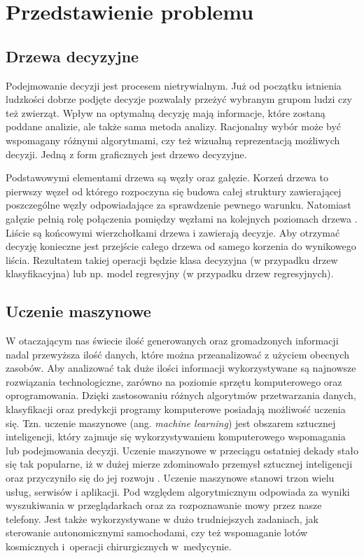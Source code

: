 \chapter{Przedstawienie problemu}

\section{Drzewa decyzyjne}


Podejmowanie decyzji jest procesem nietrywialnym. Już od początku istnienia ludzkości dobrze podjęte decyzje pozwalały przeżyć wybranym grupom ludzi czy też zwierząt. Wpływ na optymalną decyzję mają informacje, które zostaną poddane analizie, ale także sama metoda analizy. Racjonalny wybór może być wspomagany różnymi algorytmami, czy też wizualną reprezentacją możliwych decyzji. Jedną z form graficznych jest drzewo decyzyjne.

Podstawowymi elementami drzewa są węzły oraz gałęzie. Korzeń drzewa to pierwszy węzeł od którego rozpoczyna się budowa całej struktury zawierającej poszczególne węzły odpowiadające za sprawdzenie pewnego warunku. Natomiast gałęzie pełnią rolę połączenia pomiędzy węzłami na kolejnych poziomach drzewa \cite{misc_1}.  Liście są końcowymi wierzchołkami drzewa i zawierają decyzje. Aby otrzymać decyzję konieczne jest przejście całego drzewa od samego korzenia do wynikowego liścia. Rezultatem takiej operacji będzie klasa decyzyjna (w przypadku drzew klasyfikacyjna) lub np. model regresyjny (w przypadku drzew regresyjnych).

\section{Uczenie maszynowe}
W otaczającym nas świecie ilość generowanych oraz gromadzonych informacji nadal przewyższa ilość danych, które można przeanalizować z użyciem obecnych zasobów. Aby analizować tak duże ilości informacji wykorzystywane są najnowsze rozwiązania technologiczne, zarówno na poziomie sprzętu komputerowego oraz oprogramowania. Dzięki zastosowaniu różnych algorytmów przetwarzania danych, klasyfikacji oraz predykcji programy komputerowe posiadają możliwość uczenia się. Tzn. uczenie maszynowe (ang. \textit{machine learning}) jest obszarem sztucznej inteligencji, który zajmuje się wykorzystywaniem komputerowego wspomagania lub podejmowania decyzji. Uczenie maszynowe w przeciągu ostatniej dekady stało się tak popularne, iż w dużej mierze zdominowało przemysł sztucznej inteligencji oraz przyczyniło się do jej rozwoju \cite{book_1}. Uczenie maszynowe stanowi trzon wielu usług, serwisów i aplikacji. Pod względem algorytmicznym odpowiada za wyniki wyszukiwania w przeglądarkach oraz za rozpoznawanie mowy przez nasze telefony. Jest także wykorzystywane w dużo trudniejszych zadaniach, jak sterowanie autonomicznymi samochodami, czy też wspomaganie lotów kosmicznych i~operacji chirurgicznych w~medycynie.

